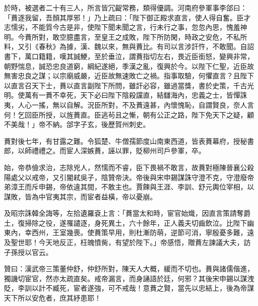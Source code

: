\begin{pinyinscope}
 於時，被選者二十有三人，所言皆冗齪常務，類得優調。河南府參軍事李郃曰：「蕡逐我留，吾顏其厚邪！」乃上疏曰：「陛下御正殿求直言，使人得自奮。臣才志懦劣，不能質今古是非，使陛下聞未聞之言，行未行之事，忽忽內思，愧羞神明。今蕡所對，敢空臆盡言，至皇王之成敗，陛下所防閑，時政之安危，不私所料，又引《春秋》為據，漢、魏以來，無與蕡比。有司以言涉訐忤，不敢聞。自詔書下，萬口籍籍，嘆其誠鯁，至於垂泣，謂蕡指切左右，畏近臣銜怒，變興非常，朝野惴息，誠恐忠良道窮，綱紀遂絕，季漢之亂，復興於今。以陛下仁聖，近臣故無害忠良之謀；以宗廟威嚴，近臣故無速敗亡之禍。指事取驗，何懼直言？且陛下以直言召天下士，蕡以直言副陛下所問，雖訐必容，雖過當獎，書於史策，千古光明。使萬有一蕡不幸死，天下必曰陛下陰殺讜直，結讎海內，忠義之士，皆憚誅夷，人心一搖，無以自解。況臣所對，不及蕡遠甚，內懷愧恥，自謂賢良，奈人言何！乞回臣所授，以旌蕡直。臣逃茍且之慚，朝有公正之路，陛下免天下之疑，顧不美哉！」帝不納。郃字子玄，後歷賀州刺史。



 蕡對後七年，有甘露之難。令狐楚、牛僧孺節度山南東西道，皆表蕡幕府，授秘書郎，以師禮禮之。而宦人深嫉蕡，誣以罪，貶柳州司戶參軍，卒。



 始，帝恭儉求治，志除兇人，然懦而不睿，臣下畏禍不敢言，故蕡對極陳晉襄公殺陽處父以戒帝，又引閽弒吳子，陰贊帝決。帝後與宋申錫謀誅守澄不克，守澄廢帝弟漳王而斥申錫，帝依違其間，不敢主也。賈餗與王涯、李訓、舒元輿位宰相，以謀敗，皆為中官夷其宗，而宦者益橫，帝以憂崩。



 及昭宗誅韓全誨等，左拾遺羅袞上言：「蕡當太和時，宦官始熾，因直言策請奪爵土，復掃除之役，遂罹譴逐，身死異土，六十餘年，正人義夫切齒飲泣。比陛下幽東內，幸西州，王室幾喪。使蕡策早用，則杜漸防萌，逆節可消，寧殷憂多難，遠及聖世耶！今天地反正，枉魄憤胔，有望於陛下。」帝感悟，贈蕡左諫議大夫，訪子孫授以官云。



 贊曰：漢武帝三策董仲舒，仲舒所對，陳天人大概，緩而不切也。蕡與諸儒偕進，獨譏切宦官，然亦太疏直矣。戒帝漏言，而身誦語於廷，何邪？其後宋申錫以謀洩貶，李訓以計不臧死，宦者遂強，可不戒哉！意蕡之賢，當先以忠結上，後為帝謀天下所以安危者，庶其紓患耶！



\end{pinyinscope}